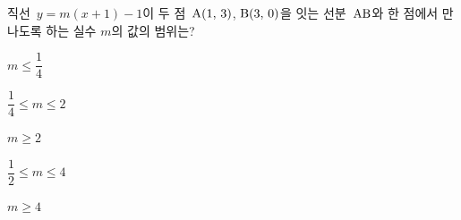 직선~$y=m(x+1)-1$이 두 점~$\mathrm{A}(1,\mkern3mu 3)$, $\mathrm{B}(3,\mkern3mu 0)$을 잇는 선분~$\mathrm{AB}$와 한 점에서 만나도록 하는 실수 $m$의 값의 범위는?
\begin{choices32}{\rule[-3ex]{0pt}{8ex}$m\le\dfrac{1}{4}$}{\rule[-3ex]{0pt}{8ex}$\dfrac{1}{4}\le m\le 2$}{\rule[-3ex]{0pt}{8ex}$m\ge 2$}{\rule[-3ex]{0pt}{8ex}$\dfrac{1}{2}\le m\le 4$}{\rule[-3ex]{0pt}{8ex}$m\ge 4$}\end{choices32}
